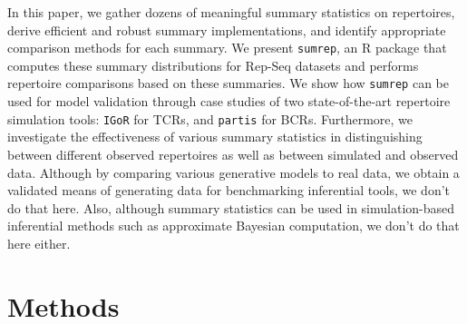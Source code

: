 \documentclass{article}
\begin{document}
In this paper, we gather dozens of meaningful summary statistics on repertoires, derive efficient and robust summary implementations, and identify appropriate comparison methods for each summary.
We present \texttt{sumrep}, an R package that computes these summary distributions for Rep-Seq datasets and performs repertoire comparisons based on these summaries.
We show how \texttt{sumrep} can be used for model validation through case studies of two state-of-the-art repertoire simulation tools: \texttt{IGoR} \cite{Marcou2018-du} for TCRs, and \texttt{partis} \cite{Ralph2016-nw, Ralph2016-iz} for BCRs.
Furthermore, we investigate the effectiveness of various summary statistics in distinguishing between different observed repertoires as well as between simulated and observed data.
Although by comparing various generative models to real data, we obtain a validated means of generating data for benchmarking inferential tools, we don't do that here.
Also, although summary statistics can be used in simulation-based inferential methods such as approximate Bayesian computation, we don't do that here either.

\section*{Methods}
\end{document}
